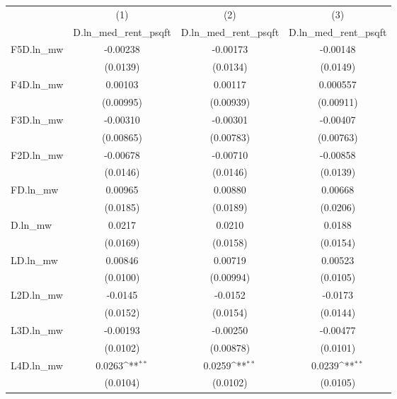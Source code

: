 {
\def\sym#1{\ifmmode^{#1}\else\(^{#1}\)\fi}
\begin{tabular}{l*{3}{c}}
\hline\hline
          &\multicolumn{1}{c}{(1)}&\multicolumn{1}{c}{(2)}&\multicolumn{1}{c}{(3)}\\
          &\multicolumn{1}{c}{D.ln\_med\_rent\_psqft}&\multicolumn{1}{c}{D.ln\_med\_rent\_psqft}&\multicolumn{1}{c}{D.ln\_med\_rent\_psqft}\\
\hline
F5D.ln\_mw & -0.00238         & -0.00173         & -0.00148         \\
          & (0.0139)         & (0.0134)         & (0.0149)         \\
[1em]
F4D.ln\_mw &  0.00103         &  0.00117         & 0.000557         \\
          &(0.00995)         &(0.00939)         &(0.00911)         \\
[1em]
F3D.ln\_mw & -0.00310         & -0.00301         & -0.00407         \\
          &(0.00865)         &(0.00783)         &(0.00763)         \\
[1em]
F2D.ln\_mw & -0.00678         & -0.00710         & -0.00858         \\
          & (0.0146)         & (0.0146)         & (0.0139)         \\
[1em]
FD.ln\_mw  &  0.00965         &  0.00880         &  0.00668         \\
          & (0.0185)         & (0.0189)         & (0.0206)         \\
[1em]
D.ln\_mw   &   0.0217         &   0.0210         &   0.0188         \\
          & (0.0169)         & (0.0158)         & (0.0154)         \\
[1em]
LD.ln\_mw  &  0.00846         &  0.00719         &  0.00523         \\
          & (0.0100)         &(0.00994)         & (0.0105)         \\
[1em]
L2D.ln\_mw &  -0.0145         &  -0.0152         &  -0.0173         \\
          & (0.0152)         & (0.0154)         & (0.0144)         \\
[1em]
L3D.ln\_mw & -0.00193         & -0.00250         & -0.00477         \\
          & (0.0102)         &(0.00878)         & (0.0101)         \\
[1em]
L4D.ln\_mw &   0.0263\sym{**} &   0.0259\sym{**} &   0.0239\sym{**} \\
          & (0.0104)         & (0.0102)         & (0.0105)         \\

\end{tabular}}
